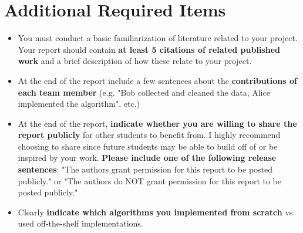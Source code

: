 \documentclass{article}
\begin{document}
\section*{Additional Required Items}

\begin{itemize}[nosep]
    \item You must conduct a basic familiarization of literature related to your project. Your report should contain \textbf{at least 5 citations of related published work} and a brief description of how these relate to your project.
    \item At the end of the report include a few sentences about the \textbf{contributions of each team member} (e.g. "Bob collected and cleaned the data, Alice implemented the algorithm", etc.)
    \item At the end of the report, \textbf{indicate whether you are willing to share the report publicly} for other students to benefit from. I highly recommend choosing to share since future students may be able to build off of or be inspired by your work. \textbf{Please include one of the following release sentences}: "The authors grant permission for this report to be posted publicly." or "The authors do NOT grant permission for this report to be posted publicly."
    \item Clearly \textbf{indicate which algorithms you implemented from scratch} vs used off-the-shelf implementations.
\end{itemize}
\end{document}
